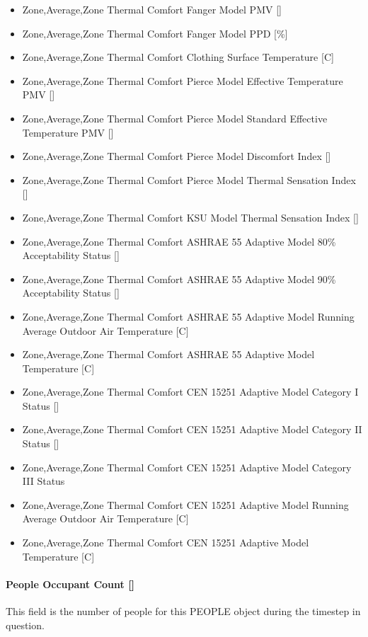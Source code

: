 \begin{itemize}
\item
  Zone,Average,Zone Thermal Comfort Fanger Model PMV {[]}
\item
  Zone,Average,Zone Thermal Comfort Fanger Model PPD {[}\%{]}
\item
  Zone,Average,Zone Thermal Comfort Clothing Surface Temperature {[}C{]}
\item
  Zone,Average,Zone Thermal Comfort Pierce Model Effective Temperature PMV {[]}
\item
  Zone,Average,Zone Thermal Comfort Pierce Model Standard Effective Temperature PMV {[]}
\item
  Zone,Average,Zone Thermal Comfort Pierce Model Discomfort Index {[]}
\item
  Zone,Average,Zone Thermal Comfort Pierce Model Thermal Sensation Index {[]}
\item
  Zone,Average,Zone Thermal Comfort KSU Model Thermal Sensation Index {[]}
\item
  Zone,Average,Zone Thermal Comfort ASHRAE 55 Adaptive Model 80\% Acceptability Status {[]}
\item
  Zone,Average,Zone Thermal Comfort ASHRAE 55 Adaptive Model 90\% Acceptability Status {[]}
\item
  Zone,Average,Zone Thermal Comfort ASHRAE 55 Adaptive Model Running Average Outdoor Air Temperature {[}C{]}
\item
  Zone,Average,Zone Thermal Comfort ASHRAE 55 Adaptive Model Temperature {[}C{]}
\item
  Zone,Average,Zone Thermal Comfort CEN 15251 Adaptive Model Category I Status {[]}
\item
  Zone,Average,Zone Thermal Comfort CEN 15251 Adaptive Model Category II Status {[]}
\item
  Zone,Average,Zone Thermal Comfort CEN 15251 Adaptive Model Category III Status
\item
  Zone,Average,Zone Thermal Comfort CEN 15251 Adaptive Model Running Average Outdoor Air Temperature {[}C{]}
\item
  Zone,Average,Zone Thermal Comfort CEN 15251 Adaptive Model Temperature {[}C{]}
\end{itemize}

\paragraph{People Occupant Count {[]}}\label{people-occupant-count}

This field is the number of people for this PEOPLE object during the timestep in question.

